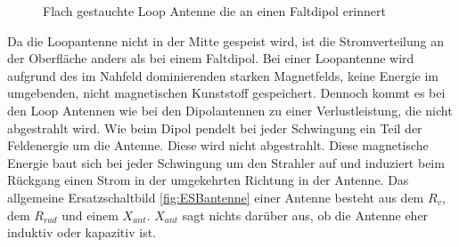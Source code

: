 \begin{figure}[!ht]
	\begin{center}
	\end{center}
\caption{Flach gestauchte Loop Antenne die an einen Faltdipol erinnert}
\label{fig:FflacheLoopAntenne}
\end{figure}
Da die Loopantenne nicht in der Mitte gespeist wird, ist die Stromverteilung an der Oberfläche anders als bei einem Faltdipol. Bei einer Loopantenne wird aufgrund des im Nahfeld dominierenden starken Magnetfelds, keine Energie im umgebenden, nicht magnetischen Kunststoff gespeichert. Dennoch kommt es bei den Loop Antennen wie bei den Dipolantennen zu einer Verlustleistung, die nicht abgestrahlt wird. Wie beim Dipol pendelt bei jeder Schwingung ein Teil der Feldenergie um die Antenne. Diese wird nicht abgestrahlt. Diese magnetische Energie baut sich bei jeder Schwingung um den Strahler auf und induziert beim Rückgang einen Strom in der umgekehrten Richtung in der Antenne. Das allgemeine Ersatzschaltbild \ref{fig:ESBantenne} einer Antenne besteht aus dem $R_{v}$, dem $R_{rad}$ und einem $X_{ant}$. $X_{ant}$ sagt nichts darüber aus, ob die Antenne eher induktiv oder kapazitiv ist. 



